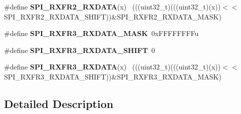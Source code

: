 \begin{DoxyCompactItemize}
\item 
\hypertarget{group___s_p_i___register___masks_gabc8371b1dd143af63fe02d90a5955a8f}{}\#define {\bfseries S\+P\+I\+\_\+\+R\+X\+F\+R2\+\_\+\+R\+X\+D\+A\+T\+A}(x)                                        ~(((uint32\+\_\+t)(((uint32\+\_\+t)(x))$<$$<$S\+P\+I\+\_\+\+R\+X\+F\+R2\+\_\+\+R\+X\+D\+A\+T\+A\+\_\+\+S\+H\+I\+F\+T))\&S\+P\+I\+\_\+\+R\+X\+F\+R2\+\_\+\+R\+X\+D\+A\+T\+A\+\_\+\+M\+A\+S\+K)\label{group___s_p_i___register___masks_gabc8371b1dd143af63fe02d90a5955a8f}

\item 
\hypertarget{group___s_p_i___register___masks_ga06579b6d579b820152dd81435d71c09e}{}\#define {\bfseries S\+P\+I\+\_\+\+R\+X\+F\+R3\+\_\+\+R\+X\+D\+A\+T\+A\+\_\+\+M\+A\+S\+K}~0x\+F\+F\+F\+F\+F\+F\+F\+Fu\label{group___s_p_i___register___masks_ga06579b6d579b820152dd81435d71c09e}

\item 
\hypertarget{group___s_p_i___register___masks_gaae4c2a3c38669f7a03fbcaabd29de0c7}{}\#define {\bfseries S\+P\+I\+\_\+\+R\+X\+F\+R3\+\_\+\+R\+X\+D\+A\+T\+A\+\_\+\+S\+H\+I\+F\+T}~0\label{group___s_p_i___register___masks_gaae4c2a3c38669f7a03fbcaabd29de0c7}

\item 
\hypertarget{group___s_p_i___register___masks_ga8c7e9deb3b65a9c53481ba16d8e6549d}{}\#define {\bfseries S\+P\+I\+\_\+\+R\+X\+F\+R3\+\_\+\+R\+X\+D\+A\+T\+A}(x)                                        ~(((uint32\+\_\+t)(((uint32\+\_\+t)(x))$<$$<$S\+P\+I\+\_\+\+R\+X\+F\+R3\+\_\+\+R\+X\+D\+A\+T\+A\+\_\+\+S\+H\+I\+F\+T))\&S\+P\+I\+\_\+\+R\+X\+F\+R3\+\_\+\+R\+X\+D\+A\+T\+A\+\_\+\+M\+A\+S\+K)\label{group___s_p_i___register___masks_ga8c7e9deb3b65a9c53481ba16d8e6549d}

\end{DoxyCompactItemize}


\subsection{Detailed Description}
